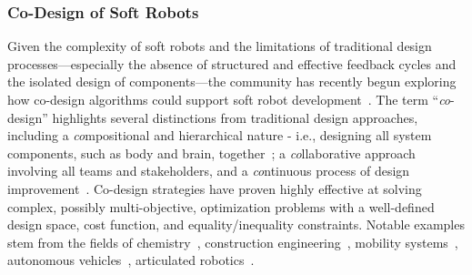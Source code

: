 \subsubsection{Co-Design of Soft Robots}
Given the complexity of soft robots and the limitations of traditional design processes—especially the absence of structured and effective feedback cycles and the isolated design of components—the community has recently begun exploring how co-design algorithms could support soft robot development~\citep{spielberg2019learning, cianchetti2021embodied, bhatia2021evolution, van2022co, wang2022curriculum, wang2023preco, wang2024diffusebot, junge2022leveraging}.
The term “\textit{co}-design” highlights several distinctions from traditional design approaches, including a \textit{co}mpositional and hierarchical nature - i.e., designing all system components, such as body and brain, together~\citep{junge2022leveraging}; a \textit{co}llaborative approach involving all teams and stakeholders, and a \textit{co}ntinuous process of design improvement~\citep{zardini2023co}.
Co-design strategies have proven highly effective at solving complex, possibly multi-objective, optimization problems with a well-defined design space, cost function, and equality/inequality constraints. 
Notable examples stem from the fields of chemistry~\citep{norskov2009towards,vaissier2018computational}, construction engineering~\citep{knippers2021integrative}, mobility systems~\citep{zardini2020co, zardini2022co}, autonomous vehicles~\citep{zardini2023co,zardini2021co}, articulated robotics~\citep{ha2018computational,zhao2020robogrammar}.

